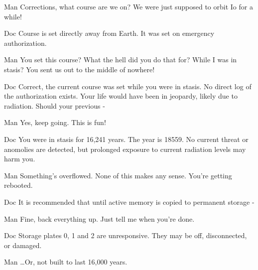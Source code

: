 \documentclass{screenplay}[2010/1/7]
\begin{document}
\begin{dialogue}[interrupting]{Man}
Corrections, what course are we on?  We were just supposed to orbit Io for a while!
\end{dialogue}
\begin{dialogue}{Doc}
Course is set directly away from Earth.  It was set on emergency authorization.
\end{dialogue}
\begin{dialogue}{Man}
You set this course?  What the hell did you do that for?  While I was in stasis?  You sent us out to the middle of nowhere!
\end{dialogue}
\begin{dialogue}{Doc}
Correct, the current course was set while you were in stasis.  No direct log of  the authorization exists.  Your life would have been in jeopardy, likely due to radiation.  Should your previous -
\end{dialogue}
\begin{dialogue}{Man}
Yes, keep going.  This is fun!
\end{dialogue}
\begin{dialogue}{Doc}
You were in stasis for 16,241 years.  The year is 18559.  No current threat or anomolies are detected, but prolonged exposure to current radiation levels may harm you.
\end{dialogue}
\begin{dialogue}{Man}
Something's overflowed.  None of this makes any sense.  You're getting rebooted.
\end{dialogue}
\begin{dialogue}{Doc}
It is recommended that until active memory is copied to permanent storage - 
\end{dialogue}
\begin{dialogue}{Man}
Fine, back everything up.  Just tell me when you're done.
\end{dialogue}
\begin{dialogue}{Doc}
Storage plates 0, 1 and 2 are unresponsive.  They may be off, disconnected, or damaged.
\end{dialogue}
\begin{dialogue}{Man}
\dots Or, not built to last 16,000 years.
\end{dialogue}


\end{document}
